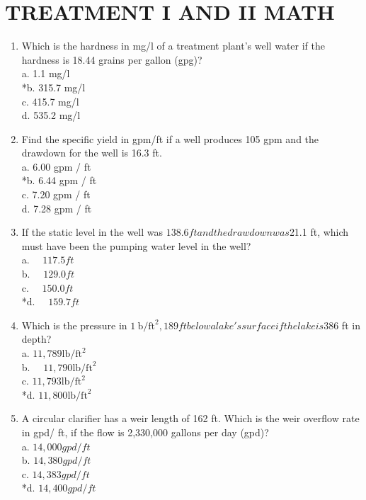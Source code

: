 \section{TREATMENT I AND II MATH}
\begin{enumerate}
\item Which is the hardness in mg/l of a treatment plant's well water if the hardness is 18.44 grains per gallon (gpg)?\\
a. 1.1 mg/l\\
*b. 315.7 mg/l\\
c. 415.7 mg/l\\
d. 535.2 mg/l\\
\item Find the specific yield in gpm/ft if a well produces 105 gpm and the drawdown for the well is 16.3 ft.\\
a. 6.00 gpm / ft\\
*b. 6.44 gpm / ft\\
c. 7.20 gpm / ft\\
d. 7.28 gpm / ft\\
\item If the static level in the well was $138.6 ft and the drawdown was $21.1 ft, which must have been the pumping water level in the well?\\
a. $\quad 117.5 ft$\\
b. $\quad 129.0 ft$\\
c. $\quad 150.0 ft$\\
*d. $\quad 159.7 ft$\\
\item Which is the pressure in $1 \mathrm{~b} / \mathrm{ft}^{2}, 189 ft below a lake's surface if the lake is $386 ft in depth?\\
a. $11,789 \mathrm{lb} / \mathrm{ft}^{2}$\\
b. $\quad 11,790 \mathrm{lb} / \mathrm{ft}^{2}$\\
c. $11,793 \mathrm{lb} / \mathrm{ft}^{2}$\\
*d. $11,800 \mathrm{lb} / \mathrm{ft}^{2}$\\
\item A circular clarifier has a weir length of 162 ft. Which is the weir overflow rate in gpd/ ft, if the flow is 2,330,000 gallons per day (gpd)?\\
a. $14,000 gpd / ft$\\
b. $14,380 gpd / ft$\\
c. $14,383 gpd / ft$\\
*d. $14,400 gpd / ft$\\

\end{enumerate}
